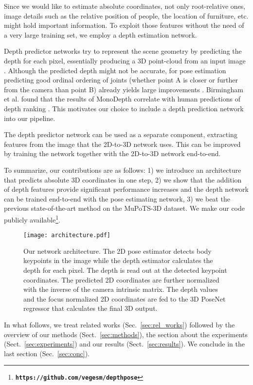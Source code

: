 \documentclass[conference]{IEEEtran}
\begin{document}
Since we would like to estimate absolute coordinates, not only root-relative ones, image details such as the relative position of people, the location of furniture, etc. might hold important information. To exploit those features without the need of a very large training set, we employ a depth estimation network. 

Depth predictor networks try to represent the scene geometry by predicting the depth for each pixel, essentially producing a 3D point-cloud from an input image \cite{monodepth2017,megadepth2018,fcrnd}. 
Although the predicted depth might not be accurate, for pose estimation predicting good ordinal ordering of joints (whether point A is closer or further from the camera than point B) already yields large improvements \cite{pavlakos2018ordinal,fbipose,drpose}. Birmingham et al. found that the results of MonoDepth \cite{monodepth2017} correlate  with human predictions of depth ranking \cite{brandon2018monodepthgoodrelative}. This motivates our choice to include a depth prediction network into our pipeline.

The depth predictor network can be used as a separate component, extracting features from the image that the 2D-to-3D network uses. This can be improved by training the network together with the 2D-to-3D network end-to-end.

To summarize, our contributions are as follows: 1) we introduce an architecture that predicts absolute 3D coordinates in one step, 2) we show that the addition of depth features provide significant performance increases and the depth network can be trained end-to-end with the pose estimating network, 3) we beat the previous state-of-the-art method on the MuPoTS-3D dataset. We make our code publicly available\footnote{\textbf{\texttt{https://github.com/vegesm/depthpose}}}.

\begin{figure*}[ht!]
\centering
\texttt{[image: architecture.pdf]}
\caption{Our network architecture. The 2D pose estimator detects body keypoints in the image while the depth estimator calculates the depth for each pixel. The depth is read out at the detected keypoint coordinates. The predicted 2D coordinates are further normalized with the inverse of the camera intrinsic matrix. The depth values and the focus normalized 2D coordinates are fed to the 3D PoseNet regressor that calculates the final 3D output.}
\label{fig:architecture}
\end{figure*}
In what follows, we treat related works (Sec.~\ref{sec:rel_works}) followed by the overview of our methods (Sect.~\ref{sec:methods}), the section about the experiments (Sect.~\ref{sec:experiments}) and our results (Sect.~\ref{sec:results}). We conclude in the last section (Sec.~\ref{sec:conc}).
\end{document}
